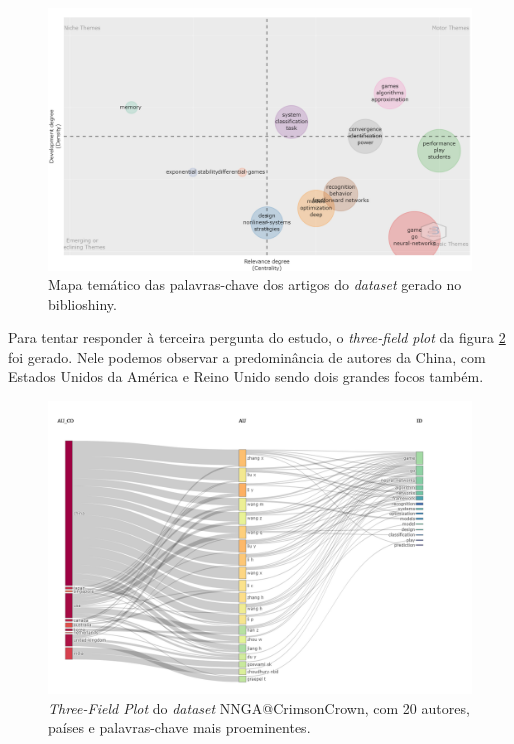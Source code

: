 \begin{figure}
    \centering
    \includegraphics[angle=0,width=1\textwidth,height=0.5\textheight]{experiments/CrimsonCrown/AnaliseBibliometrica/RedesNeuraisJogos/NNGAThematicMap.png}
    \caption{Mapa temático das palavras-chave dos artigos do \textit{dataset} gerado no biblioshiny.}
    \label{fig:CrimsonCrown:NNGA:ThematicMap}
\end{figure}

Para tentar responder à terceira pergunta do estudo, o \textit{three-field plot} da figura \ref{fig:CrimsonCrown:NNGA:TFP} foi gerado. Nele podemos observar a predominância de autores da China, com Estados Unidos da América e Reino Unido sendo dois grandes focos também.

\begin{figure}
    \centering
    \includegraphics[angle=0,width=1\textwidth,height=0.5\textheight]{experiments/CrimsonCrown/AnaliseBibliometrica/RedesNeuraisJogos/NNGASankeyAuCoKW.png}
    \caption{\textit{Three-Field Plot} do \textit{dataset} NNGA@CrimsonCrown, com 20 autores, países e palavras-chave mais proeminentes.}
    \label{fig:CrimsonCrown:NNGA:TFP}
\end{figure}

